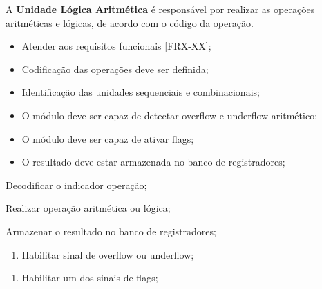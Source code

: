 A \textbf{Unidade Lógica Aritmética} é responsável por realizar as operações aritméticas e lógicas, de acordo com o código da operação.
  
\actors
	\begin{description}
	\end{description}
  
\preconditions 
	\begin{itemize}
	\item Atender aos requisitos funcionais [FRX-XX];
	\item Codificação das operações deve ser definida;
	\item Identificação das unidades sequenciais e combinacionais;
	\end{itemize}

\postconditions
    \begin{itemize}
     \item O módulo deve ser capaz de detectar overflow e underflow aritmético;
     \item O módulo deve ser capaz de ativar flags;
     \item O resultado deve estar armazenada no banco de registradores; %
     \end{itemize}
  
%
 
  
\begin{mainflow}
\item Decodificar o indicador operação;
\item Realizar operação aritmética ou lógica;
\item Armazenar o resultado no banco de registradores;
\end{mainflow}
  
\begin{secondaryflow} 
\begin{enumerate}
\item Habilitar sinal de overflow ou underflow;
\end{enumerate}
\begin{enumerate}
\item Habilitar um dos sinais de flags;
\end{enumerate}
\end{secondaryflow} 
